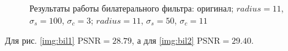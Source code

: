 \begin{figure}[H]
	\centering
	\hspace{0.0125ex}
	\hspace{0.0125ex}
	\caption{Результаты работы билатерального фильтра:  оригинал;  $radius=11$, $\sigma_s=100$, $\sigma_c=3$;  $radius=11$, $\sigma_s=50$, $\sigma_c=11$}
\end{figure}
Для рис. \ref{img:bil1} PSNR$=28.79$, а для \ref{img:bil2} PSNR$=29.40$.


